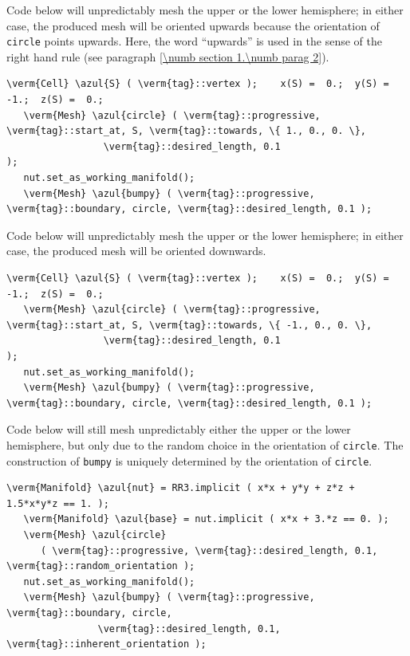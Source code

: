 Code below will unpredictably mesh the upper or the lower hemisphere;
in either case, the produced mesh will be oriented upwards because the orientation
of {\small\tt circle} points upwards.
Here, the word ``upwards'' is used in the sense of the right hand rule
(see paragraph \ref{\numb section 1.\numb parag 2}).

\begin{Verbatim}[commandchars=\\\{\},formatcom=\small\tt,
   baselinestretch=0.94,framesep=2mm                     ]
   \verm{Cell} \azul{S} ( \verm{tag}::vertex );    x(S) =  0.;  y(S) = -1.;  z(S) =  0.;
   \verm{Mesh} \azul{circle} ( \verm{tag}::progressive, \verm{tag}::start_at, S, \verm{tag}::towards, \{ 1., 0., 0. \},
                 \verm{tag}::desired_length, 0.1                                          );
   nut.set_as_working_manifold();
   \verm{Mesh} \azul{bumpy} ( \verm{tag}::progressive, \verm{tag}::boundary, circle, \verm{tag}::desired_length, 0.1 );
\end{Verbatim}

Code below will unpredictably mesh the upper or the lower hemisphere;
in either case, the produced mesh will be oriented downwards.

\begin{Verbatim}[commandchars=\\\{\},formatcom=\small\tt,
   baselinestretch=0.94,framesep=2mm                     ]
   \verm{Cell} \azul{S} ( \verm{tag}::vertex );    x(S) =  0.;  y(S) = -1.;  z(S) =  0.;
   \verm{Mesh} \azul{circle} ( \verm{tag}::progressive, \verm{tag}::start_at, S, \verm{tag}::towards, \{ -1., 0., 0. \},
                 \verm{tag}::desired_length, 0.1                                           );
   nut.set_as_working_manifold();
   \verm{Mesh} \azul{bumpy} ( \verm{tag}::progressive, \verm{tag}::boundary, circle, \verm{tag}::desired_length, 0.1 );
\end{Verbatim}

Code below will still mesh unpredictably either the upper or the lower
hemisphere, but only due to the random choice in the orientation of {\small\tt circle}.
The construction of {\small\tt bumpy} is uniquely determined by the orientation of
{\small\tt circle}.

\begin{Verbatim}[commandchars=\\\{\},formatcom=\small\tt,
   baselinestretch=0.94,framesep=2mm                      ]
   \verm{Manifold} \azul{nut} = RR3.implicit ( x*x + y*y + z*z + 1.5*x*y*z == 1. );
   \verm{Manifold} \azul{base} = nut.implicit ( x*x + 3.*z == 0. );
   \verm{Mesh} \azul{circle}
      ( \verm{tag}::progressive, \verm{tag}::desired_length, 0.1, \verm{tag}::random_orientation );
   nut.set_as_working_manifold();
   \verm{Mesh} \azul{bumpy} ( \verm{tag}::progressive, \verm{tag}::boundary, circle,
                \verm{tag}::desired_length, 0.1, \verm{tag}::inherent_orientation );
\end{Verbatim}


